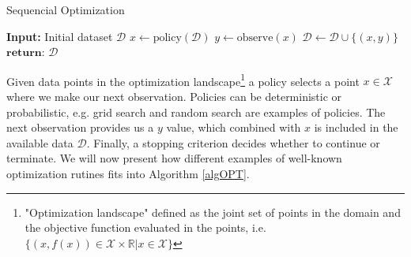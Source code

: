 \begin{algorithm}
\caption{Sequencial Optimization \cite{bayesoptbook} }\label{algOPT}
\begin{algorithmic}
\State \textbf{Input:} Initial dataset $\mathcal{D}$  
    \State $x \gets \text{policy}(\mathcal{D})$ 
    \State $y \gets \text{observe}(x)$ 
    \State $\mathcal{D} \gets \mathcal{D} \cup \{(x,y)\} $ 
\EndWhile
\State $\textbf{return: } \mathcal{D}$
\end{algorithmic}
\end{algorithm}

Given data points in the optimization landscape\footnote{"Optimization landscape" defined as the
joint set of points in the domain and the objective function evaluated in the points, i.e.
$\{(x,f(x))\in \mathcal{X} \times \mathbb{R}| x \in \mathcal{X}\}$} a policy selects a point $x \in
\mathcal{X}$ where we make our next observation. Policies can be deterministic or probabilistic, e.g.
grid search and random search are examples of policies. The next observation provides us a $y$
value, which combined with $x$ is included in the available data $\mathcal{D}$. Finally, a stopping
criterion decides whether to continue or terminate. We will now present how different examples of 
well-known optimization rutines fits into Algorithm \eqref{algOPT}.


